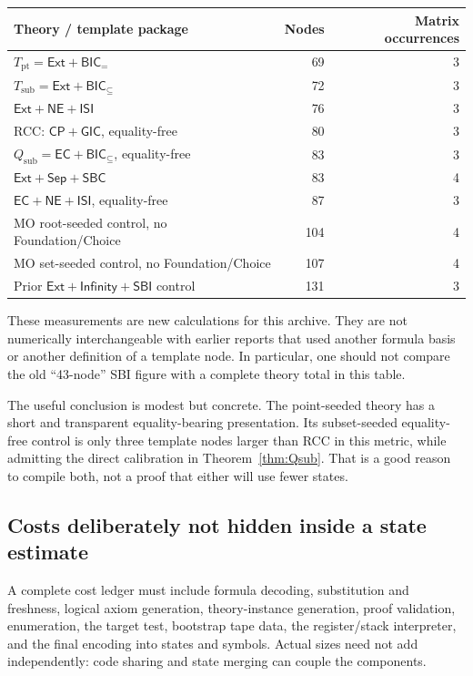\documentclass[11pt,letterpaper]{article}
\theoremstyle{definition}\newtheorem{definition}[theorem]{Definition}
\theoremstyle{remark}\newtheorem{remark}[theorem]{Remark}
\newcommand{\Ext}{\mathsf{Ext}}
\newcommand{\Sep}{\mathsf{Sep}}
\newcommand{\BIC}{\mathsf{BIC}}
\newcommand{\SBC}{\mathsf{SBC}}
\newcommand{\SBI}{\mathsf{SBI}}
\newcommand{\ISI}{\mathsf{ISI}}
\newcommand{\EC}{\mathsf{EC}}
\newcommand{\NE}{\mathsf{NE}}
\newcommand{\CP}{\mathsf{CP}}
\newcommand{\GIC}{\mathsf{GIC}}
\newcommand{\Tpt}{T_{\mathrm{pt}}}
\newcommand{\Tsub}{T_{\mathrm{sub}}}
\newcommand{\QTsub}{Q_{\mathrm{sub}}}
\begin{document}
\begin{center}
\begin{tabular}{p{.49\linewidth}rr}
\toprule
Theory / template package & Nodes & Matrix occurrences\\
\midrule
$\Tpt=\Ext+\BIC_{=}$ & 69 & 3\\
$\Tsub=\Ext+\BIC_{\subseteq}$ & 72 & 3\\
$\Ext+\NE+\ISI$ & 76 & 3\\
RCC: $\CP+\GIC$, equality-free & 80 & 3\\
$\QTsub=\EC+\BIC_{\subseteq}$, equality-free & 83 & 3\\
$\Ext+\Sep+\SBC$ & 83 & 4\\
$\EC+\NE+\ISI$, equality-free & 87 & 3\\
MO root-seeded control, no Foundation/Choice & 104 & 4\\
MO set-seeded control, no Foundation/Choice & 107 & 4\\
Prior $\Ext+\mathsf{Infinity}+\SBI$ control & 131 & 3\\
\bottomrule
\end{tabular}
\end{center}

These measurements are new calculations for this archive. They are not
numerically interchangeable with earlier reports that used another
formula basis or another definition of a template node. In particular,
one should not compare the old ``43-node'' SBI figure with a complete
theory total in this table.

The useful conclusion is modest but concrete. The point-seeded theory
has a short and transparent equality-bearing presentation. Its
subset-seeded equality-free control is only three template nodes larger
than RCC in this metric, while admitting the direct calibration in
Theorem~\ref{thm:Qsub}. That is a good reason to compile both, not a
proof that either will use fewer states.

\subsection{Costs deliberately not hidden inside a state estimate}

A complete cost ledger must include formula decoding, substitution and
freshness, logical axiom generation, theory-instance generation, proof
validation, enumeration, the target test, bootstrap tape data, the
register/stack interpreter, and the final encoding into states and
symbols. Actual sizes need not add independently: code sharing and
state merging can couple the components.
\end{document}
